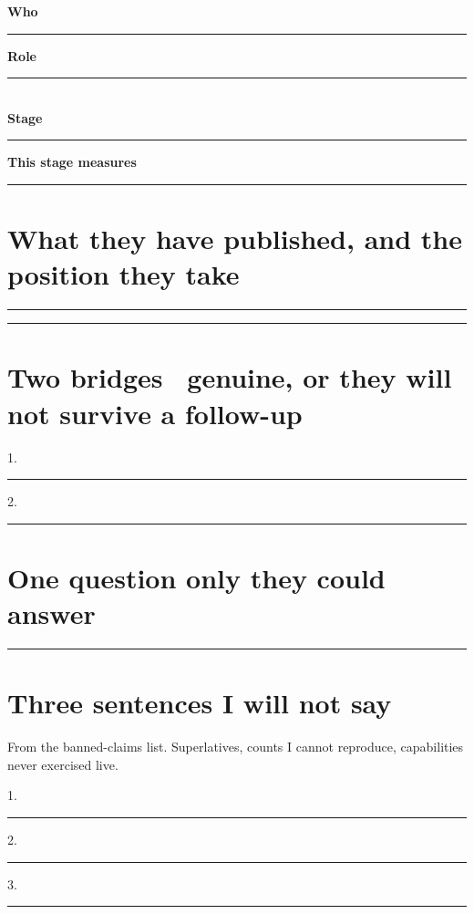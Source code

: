 


\textbf{Who} \rule{55mm}{0.4pt}\quad \textbf{Role} \rule{45mm}{0.4pt}\\
\textbf{Stage} \rule{40mm}{0.4pt}\quad \textbf{This stage measures}
\rule{60mm}{0.4pt}

\section{What they have published, and the position they take}
\rule{\linewidth}{0.4pt}\par\vspace{7pt}\rule{\linewidth}{0.4pt}\par\vspace{7pt}

\section{Two bridges \dash\ genuine, or they will not survive a follow-up}
1.\ \rule{0.94\linewidth}{0.4pt}\par\vspace{6pt}
2.\ \rule{0.94\linewidth}{0.4pt}\par\vspace{6pt}

\section{One question only they could answer}
\rule{\linewidth}{0.4pt}\par\vspace{7pt}

\section{Three sentences I will not say}
{\color{kitgrey}\small From the banned-claims list. Superlatives, counts I
cannot reproduce, capabilities never exercised live.}\par\vspace{2pt}
1.\ \rule{0.94\linewidth}{0.4pt}\par\vspace{6pt}
2.\ \rule{0.94\linewidth}{0.4pt}\par\vspace{6pt}
3.\ \rule{0.94\linewidth}{0.4pt}\par\vspace{6pt}

